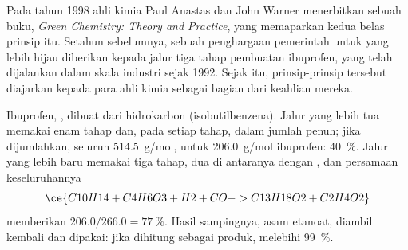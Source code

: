 \begin{history}
Pada tahun 1998 ahli kimia Paul Anastas dan John Warner menerbitkan
sebuah buku, \emph{Green Chemistry: Theory and Practice}, yang
memaparkan kedua belas prinsip itu. Setahun sebelumnya, sebuah
penghargaan pemerintah untuk  yang lebih hijau diberikan kepada
jalur tiga tahap pembuatan ibuprofen, yang telah dijalankan dalam skala
industri sejak 1992. Sejak itu, prinsip-prinsip tersebut diajarkan
kepada para ahli kimia sebagai bagian dari keahlian mereka.
\end{history}

\begin{example}\label{ex:g12:synthesis-strategy:ibuprofen}
Ibuprofen, , dibuat dari hidrokarbon 
(isobutilbenzena). Jalur yang lebih tua memakai enam tahap dan, pada
setiap tahap,  dalam jumlah penuh; jika dijumlahkan, 
seluruh  \qty{514.5}{g/mol}, untuk \qty{206.0}{g/mol}
ibuprofen:  \qty{40}{\percent}. Jalur yang lebih baru
memakai tiga tahap, dua di antaranya dengan , dan persamaan
keseluruhannya
\[
  \ce{C10H14 + C4H6O3 + H2 + CO -> C13H18O2 + C2H4O2}
\]
memberikan $206.0/266.0 = \qty{77}{\percent}$. Hasil sampingnya, asam
etanoat, diambil kembali dan dipakai: jika dihitung sebagai produk,
 melebihi \qty{99}{\percent}.
\end{example}

